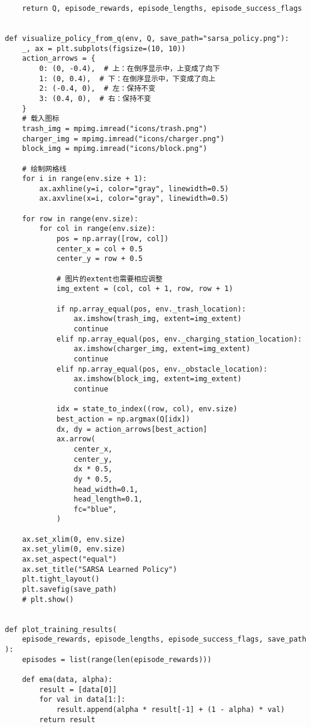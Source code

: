 \begin{verbatim}
    return Q, episode_rewards, episode_lengths, episode_success_flags


def visualize_policy_from_q(env, Q, save_path="sarsa_policy.png"):
    _, ax = plt.subplots(figsize=(10, 10))
    action_arrows = {
        0: (0, -0.4),  # 上：在倒序显示中，上变成了向下
        1: (0, 0.4),  # 下：在倒序显示中，下变成了向上
        2: (-0.4, 0),  # 左：保持不变
        3: (0.4, 0),  # 右：保持不变
    }
    # 载入图标
    trash_img = mpimg.imread("icons/trash.png")
    charger_img = mpimg.imread("icons/charger.png")
    block_img = mpimg.imread("icons/block.png")

    # 绘制网格线
    for i in range(env.size + 1):
        ax.axhline(y=i, color="gray", linewidth=0.5)
        ax.axvline(x=i, color="gray", linewidth=0.5)

    for row in range(env.size):
        for col in range(env.size):
            pos = np.array([row, col])
            center_x = col + 0.5
            center_y = row + 0.5

            # 图片的extent也需要相应调整
            img_extent = (col, col + 1, row, row + 1)

            if np.array_equal(pos, env._trash_location):
                ax.imshow(trash_img, extent=img_extent)
                continue
            elif np.array_equal(pos, env._charging_station_location):
                ax.imshow(charger_img, extent=img_extent)
                continue
            elif np.array_equal(pos, env._obstacle_location):
                ax.imshow(block_img, extent=img_extent)
                continue

            idx = state_to_index((row, col), env.size)
            best_action = np.argmax(Q[idx])
            dx, dy = action_arrows[best_action]
            ax.arrow(
                center_x,
                center_y,
                dx * 0.5,
                dy * 0.5,
                head_width=0.1,
                head_length=0.1,
                fc="blue",
            )

    ax.set_xlim(0, env.size)
    ax.set_ylim(0, env.size)
    ax.set_aspect("equal")
    ax.set_title("SARSA Learned Policy")
    plt.tight_layout()
    plt.savefig(save_path)
    # plt.show()


def plot_training_results(
    episode_rewards, episode_lengths, episode_success_flags, save_path
):
    episodes = list(range(len(episode_rewards)))

    def ema(data, alpha):
        result = [data[0]]
        for val in data[1:]:
            result.append(alpha * result[-1] + (1 - alpha) * val)
        return result


\end{verbatim}
